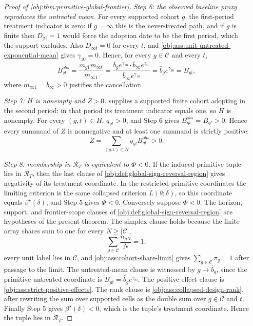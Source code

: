 \begin{proof}[Proof of \cref{obj:thm:primitive-global-frontier}]
\textit{Step 6: the observed baseline proxy reproduces the untreated mean.} For every supported cohort \(g\), the first-period treatment indicator is zero: if \(g=\infty\) this is the never-treated path, and if \(g\) is finite then \(D_{g1}=1\) would force the adoption date to be the first period, which the support excludes. Also \(D_{\infty t}=0\) for every \(t\), and \cref{obj:ass:unit-untreated-exponential-mean} gives \(\gamma_{10}=0\). Hence, for every \(g\in\mathcal C\) and every \(t\),
\[
B^{obs}_{gt}
=
\frac{m_{g1}m_{\infty t}}{m_{\infty 1}}
=
\frac{\bar b_ge^{\gamma_{10}}\cdot\bar b_\infty e^{\gamma_{t0}}}{\bar b_\infty e^{\gamma_{10}}}
=
\bar b_ge^{\gamma_{t0}}
=
B_{gt},
\]
where \(m_{\infty1}=\bar b_\infty>0\) justifies the cancellation.

\textit{Step 7: \(H\) is nonempty and \(Z>0\).}  supplies a supported finite cohort adopting in the second period; in that period its treatment indicator equals one, so \(H\) is nonempty. For every \((g,t)\in H\), \(q_{gt}>0\), and Step 6 gives \(B^{obs}_{gt}=B_{gt}>0\). Hence every summand of \(Z\) is nonnegative and at least one summand is strictly positive:
\[
Z=\sum_{(g,t)\in H}q_{gt}B^{obs}_{gt}>0 .
\]

\textit{Step 8: membership in \(\mathcal R_T\) is equivalent to \(\Phi<0\).} If the induced primitive tuple lies in \(\mathcal R_T\), then the last clause of \cref{obj:def:global-sign-reversal-region} gives negativity of its treatment coordinate. In the restricted primitive coordinates the limiting criterion is the same collapsed criterion \(L(\theta;\delta)\), so this coordinate equals \(\beta^\star(\delta)\), and Step 5 gives \(\Phi<0\).
Conversely suppose \(\Phi<0\). The horizon, support, and frontier-scope clauses of \cref{obj:def:global-sign-reversal-region} are hypotheses of the present theorem. The simplex clause holds because the finite-array shares sum to one for every \(N\ge|\mathcal C|\),
\[
\sum_{g\in\mathcal C}\frac{n_{gN}}{N}=1,
\]
every unit label lies in \(\mathcal C\), and \cref{obj:ass:cohort-share-limit} gives
\(\sum_{g\in\mathcal C}\pi_g=1\) after passage to the limit.
The untreated-mean clause is witnessed by \(g\mapsto\bar b_g\), since the primitive untreated coordinate is \(B_{gt}=\bar b_g e^{\gamma_{t0}}\). The positive-effect clause is \cref{obj:ass:strict-positive-effects}. The rank clause is \cref{obj:ass:collapsed-design-rank}, after rewriting the sum over supported cells as the double sum over \(g\in\mathcal C\) and \(t\). Finally Step 5 gives \(\beta^\star(\delta)<0\), which is the tuple's treatment coordinate. Hence the tuple lies in \(\mathcal R_T\).


\end{proof}
